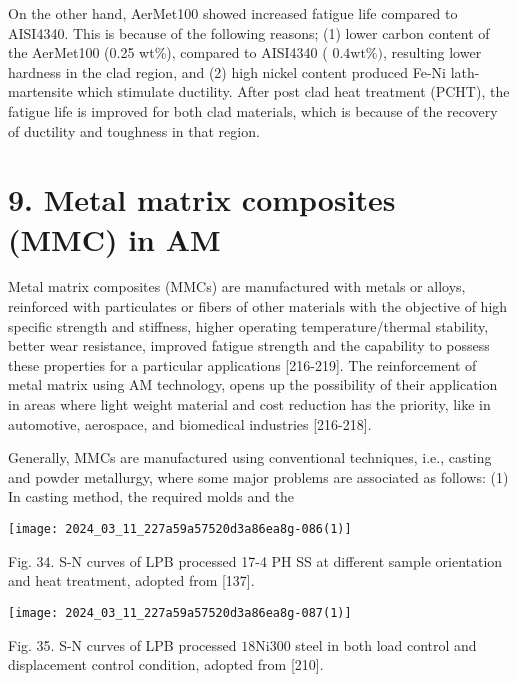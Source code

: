 \documentclass[10pt]{article}
\begin{document}
On the other hand, AerMet100 showed increased fatigue life compared to AISI4340. This is because of the following reasons; (1) lower carbon content of the AerMet100 (0.25 wt\%), compared to AISI4340 ( $0.4 \mathrm{wt} \%)$, resulting lower hardness in the clad region, and (2) high nickel content produced Fe-Ni lath-martensite which stimulate ductility. After post clad heat treatment (PCHT), the fatigue life is improved for both clad materials, which is because of the recovery of ductility and toughness in that region.

\section*{9. Metal matrix composites (MMC) in AM}
Metal matrix composites (MMCs) are manufactured with metals or alloys, reinforced with particulates or fibers of other materials with the objective of high specific strength and stiffness, higher operating temperature/thermal stability, better wear resistance, improved fatigue strength and the capability to possess these properties for a particular applications [216-219]. The reinforcement of metal matrix using AM technology, opens up the possibility of their application in areas where light weight material and cost reduction has the priority, like in automotive, aerospace, and biomedical industries [216-218].

Generally, MMCs are manufactured using conventional techniques, i.e., casting and powder metallurgy, where some major problems are associated as follows: (1) In casting method, the required molds and the

\begin{center}
\texttt{[image: 2024\_03\_11\_227a59a57520d3a86ea8g-086(1)]}
\end{center}

Fig. 34. S-N curves of LPB processed 17-4 PH SS at different sample orientation and heat treatment, adopted from [137].

\begin{center}
\texttt{[image: 2024\_03\_11\_227a59a57520d3a86ea8g-087(1)]}
\end{center}

Fig. 35. S-N curves of LPB processed $18 \mathrm{Ni} 300$ steel in both load control and displacement control condition, adopted from [210].
\end{document}
